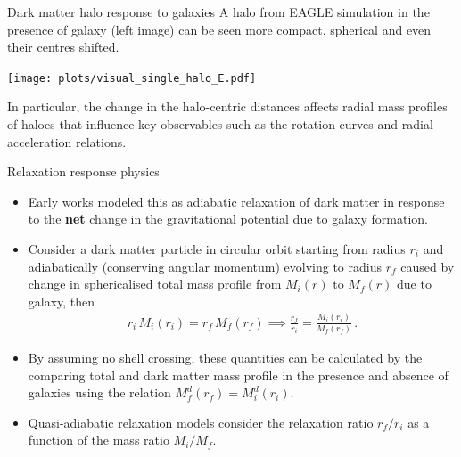 \documentclass{beamer}
\begin{document}
    

\begin{frame}{Dark matter halo response to galaxies}
    A halo from EAGLE simulation in the presence of galaxy (left image) can be seen more compact, spherical and even their centres shifted.
    \begin{center}
        \texttt{[image: plots/visual\_single\_halo\_E.pdf]}
    \end{center} 
    In particular, the change in the halo-centric distances affects radial mass profiles of haloes that influence key observables such as the rotation curves and radial acceleration relations.
\end{frame}

\begin{frame}{Relaxation response physics}
\begin{itemize}
        \item Early works modeled this as adiabatic relaxation of dark matter in response to the \textbf{\color{red}net} change in the gravitational potential due to galaxy formation.
        \item Consider a dark matter particle in circular orbit starting from radius $r_i$ and adiabatically (conserving angular momentum) evolving to radius $r_f$ caused by change in sphericalised total mass profile from $M_i(r)$ to $M_f(r)$ due to galaxy, then
        \begin{align*}
            r_i \,M_i(r_i) = r_f \,M_f(r_f) %
            \implies 
            \frac{r_f}{r_i} = \frac{M_i(r_i)}{M_f(r_f)}\,. 
        \end{align*}
        \item By assuming no shell crossing, these quantities can be calculated by the comparing total and dark matter mass profile in the presence and absence of galaxies using the relation $M_f^d(r_f) = M_i^d(r_i)$.
        \item Quasi-adiabatic relaxation models consider the relaxation ratio $r_f/r_i$ as a function of the mass ratio $M_i/M_f$.
    \end{itemize}
\end{frame}
\end{document}
